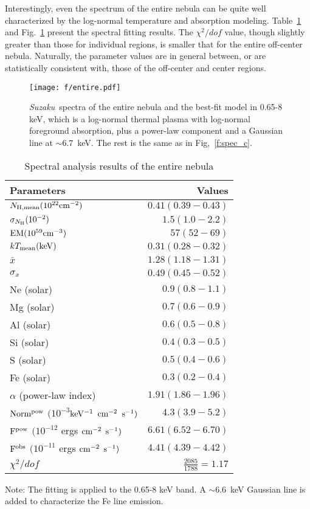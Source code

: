 \documentclass[usenatbib]{mnras}
\def\suzaku{{\sl Suzaku}}
\begin{document}
Interestingly, even the spectrum of the entire nebula can be quite well characterized by the log-normal temperature and absorption modeling. Table~\ref{t:spec-total} and Fig.~\ref{f:spec_entire} present the spectral fitting results.
The $\chi^2/dof$ value, though slightly greater than those for individual regions, is smaller that for the entire off-center nebula.  Naturally, the parameter values are in general between, or are statistically consistent with, those of the off-center and center regions.

\begin{figure}
\texttt{[image: f/entire.pdf]}
\caption{\suzaku\ spectra of the entire nebula and the best-fit model in 0.65-8 keV, which is a log-normal thermal plasma with log-normal foreground absorption, plus a power-law component and a Gaussian line at $\sim 6.7$~keV. The rest is the same as in Fig,~\ref{f:spec_c}.}
\label{f:spec_entire}
\end{figure}

\begin{table}%
\caption{Spectral analysis results of the entire nebula}
\label{t:spec-total}
\begin{tabular}{lr}
\hline
Parameters & Values \\
\hline
$N_{\rm H, mean} (10^{22}\rm{cm}^{-2})$ & $0.41(0.39-0.43)$ \\
$\sigma_{N_{\rm H}} (10^{-2})$ & $1.5(1.0-2.2)$ \\
$\rm{EM(10^{59}cm^{-3})}$ & $57(52-69)$ \\
$kT_{\rm mean}(\rm{keV})$ & $0.31(0.28-0.32)$ \\
$\bar{x}\ $ &$1.28(1.18-1.31)$ \\
$\sigma_{x}\ $ & $0.49(0.45-0.52)$ \\
Ne (solar)& $0.9(0.8-1.1)$ \\
Mg (solar)& $0.7(0.6-0.9)$  \\ 
Al (solar)& $0.6(0.5-0.8)$  \\
Si (solar)& $0.4(0.3-0.5)$ \\
S (solar)& $0.5(0.4-0.6)$ \\
Fe (solar)& $0.3(0.2-0.4)$  \\
$\alpha$ (power-law index)& $1.91(1.86-1.96)$ \\
$\rm{Norm^{pow}}$ $(10^{-3}$$\rm{keV^{-1}}$ $\rm{cm^{-2}}$ $\rm{s^{-1}})$& $4.3(3.9-5.2)$  \\
$\rm{F^{pow}}$ $(10^{-12}$ ergs $\rm{cm^{-2}}$ $\rm{s^{-1})}$ & $6.61(6.52-6.70)$ \\
$\rm{F^{obs}}$ $(10^{-11}$ ergs $\rm{cm^{-2}}$ $\rm{s^{-1})}$ & $4.41(4.39-4.42)$ \\ 
$\chi^2/dof$ & $\frac{2085}{1788}=1.17$ \\
\hline
\end{tabular}

Note: The fitting is applied to the 0.65-8 keV band. A $\sim6.6$~keV Gaussian line is added to characterize the Fe line emission.
\end{table}
\end{document}
